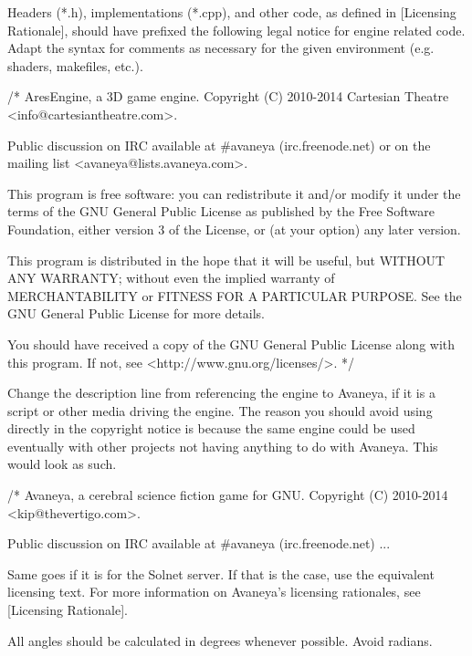 Headers (*.h), implementations (*.cpp), and other code, as defined in [Licensing Rationale], should have prefixed the following legal notice for engine related code. Adapt the syntax for comments as necessary for the given environment (e.g. shaders, makefiles, etc.).

\startCodeExample
/*
    AresEngine, a 3D game engine.
    Copyright (C) 2010-2014 Cartesian Theatre <info@cartesiantheatre.com>.

    Public discussion on IRC available at #avaneya (irc.freenode.net)
    or on the mailing list <avaneya@lists.avaneya.com>.

    This program is free software: you can redistribute it and/or modify
    it under the terms of the GNU General Public License as published by
    the Free Software Foundation, either version 3 of the License, or
    (at your option) any later version.

    This program is distributed in the hope that it will be useful,
    but WITHOUT ANY WARRANTY; without even the implied warranty of
    MERCHANTABILITY or FITNESS FOR A PARTICULAR PURPOSE.  See the
    GNU General Public License for more details.

    You should have received a copy of the GNU General Public License
    along with this program.  If not, see <http://www.gnu.org/licenses/>.
*/
\stopCodeExample

Change the description line from referencing the engine to Avaneya, if it is a script or other media driving the engine. The reason you should avoid using  directly in the copyright notice is because the same engine could be used eventually with other projects not having anything to do with Avaneya. This would look as such.

\startCodeExample
/*
    Avaneya, a cerebral science fiction game for GNU.
    Copyright (C) 2010-2014 <kip@thevertigo.com>.

    Public discussion on IRC available at #avaneya (irc.freenode.net)
    ...
\stopCodeExample

Same goes if it is for the Solnet server. If that is the case, use the equivalent licensing text. For more information on Avaneya's licensing rationales, see [Licensing Rationale].


\startitemize[4]
\item
All angles should be calculated in degrees whenever possible. Avoid radians.

